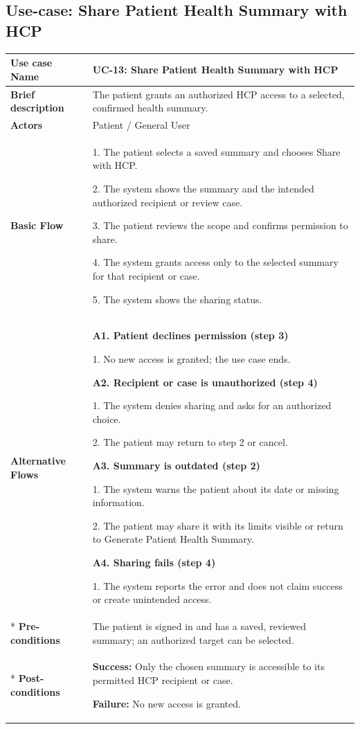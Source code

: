 \clearpage
\subsection{Use-case: Share Patient Health Summary with HCP}
\label{uc:uc-13}

\begin{longtable}{|p{}|p{}|}
\hline
\textbf{Use case Name} & UC-13: Share Patient Health Summary with HCP \\ \hline
\textbf{Brief description} & The patient grants an authorized HCP access to a selected, confirmed health summary. \\ \hline
\textbf{Actors} & Patient / General User \\ \hline
\textbf{Basic Flow} &
1. The patient selects a saved summary and chooses Share with HCP.\par
2. The system shows the summary and the intended authorized recipient or review case.\par
3. The patient reviews the scope and confirms permission to share.\par
4. The system grants access only to the selected summary for that recipient or case.\par
5. The system shows the sharing status.
\\ \hline
\textbf{Alternative Flows} &
\textbf{A1. Patient declines permission (step 3)}\par
1. No new access is granted; the use case ends.
\par
\textbf{A2. Recipient or case is unauthorized (step 4)}\par
1. The system denies sharing and asks for an authorized choice.\par
2. The patient may return to step 2 or cancel.
\par
\textbf{A3. Summary is outdated (step 2)}\par
1. The system warns the patient about its date or missing information.\par
2. The patient may share it with its limits visible or return to Generate Patient Health Summary.
\par
\textbf{A4. Sharing fails (step 4)}\par
1. The system reports the error and does not claim success or create unintended access.
\\* \hline
\textbf{Pre-conditions} & The patient is signed in and has a saved, reviewed summary; an authorized target can be selected. \\* \hline
\textbf{Post-conditions} & \textbf{Success:} Only the chosen summary is accessible to its permitted HCP recipient or case.\par
\textbf{Failure:} No new access is granted. \\ \hline
\end{longtable}


